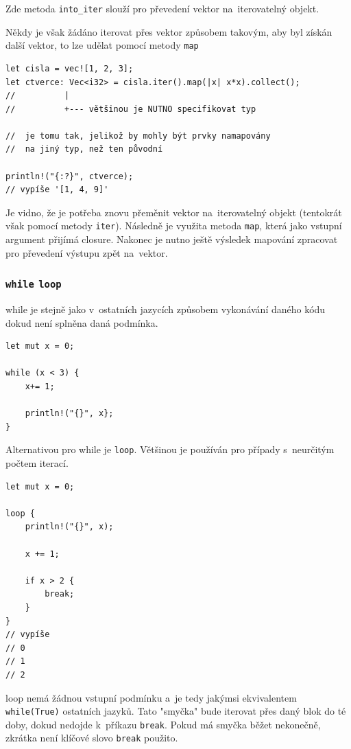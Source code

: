\documentclass[a4paper, 12pt, twoside]{article} %
\newcommand{\rust}[1]{\texttt{#1}}
\begin{document}
			Zde metoda \rust{into_iter} slouží pro převedení vektor na~iterovatelný objekt.
	
			Někdy je však žádáno iterovat přes vektor způsobem takovým, aby byl získán další vektor, to lze udělat pomocí metody \rust{map}
			\begin{verbatim}
let cisla = vec![1, 2, 3];
let ctverce: Vec<i32> = cisla.iter().map(|x| x*x).collect();
//          |
//          +--- většinou je NUTNO specifikovat typ

//  je tomu tak, jelikož by mohly být prvky namapovány
//  na jiný typ, než ten původní

println!("{:?}", ctverce);
// vypíše '[1, 4, 9]'
			\end{verbatim}
	
			Je vidno, že je potřeba znovu přeměnit vektor na~iterovatelný objekt (tentokrát však pomocí metody \rust{iter}\cite{iter_into_iter}). Následně je využita metoda \rust{map}, která jako vstupní argument přijímá closure. Nakonec je nutno ještě výsledek mapování zpracovat pro převedení výstupu zpět na~vektor.


		\subsubsection*{\rust{while} \rust{loop}}
			while je stejně jako v~ostatních jazycích způsobem vykonávání daného kódu dokud není splněna daná podmínka.
			\begin{verbatim}
let mut x = 0;

while (x < 3) {
	x+= 1;
	
	println!("{}", x};
}
			\end{verbatim}
			
			Alternativou pro while je \rust{loop}. Většinou je používán pro případy s~neurčitým počtem iterací.
			\begin{verbatim}
let mut x = 0;

loop {
	println!("{}", x);
	
	x += 1;
	
	if x > 2 {
		break;
	}
}
// vypíše
// 0
// 1
// 2
			\end{verbatim}
			
			loop nemá žádnou vstupní podmínku a~je tedy jakýmsi ekvivalentem \linebreak\rust{while(True)} ostatních jazyků. Tato "smyčka" bude iterovat přes daný blok do té doby, dokud nedojde k~příkazu \texttt{break}. Pokud má smyčka běžet nekonečně, zkrátka není klíčové slovo \texttt{break} použito.
\end{document}
